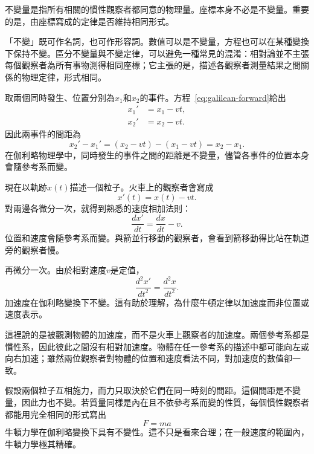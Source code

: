 不變量是指所有相關的慣性觀察者都同意的物理量。座標本身不必是不變量。重要的是，由座標寫成的定律是否維持相同形式。

「不變」既可作名詞，也可作形容詞。數值可以是不變量，方程也可以在某種變換下保持不變。區分不變量與不變定律，可以避免一種常見的混淆：相對論並不主張每個觀察者為所有事物測得相同座標；它主張的是，描述各觀察者測量結果之間關係的物理定律，形式相同。

取兩個同時發生、位置分別為\(x_1\)和\(x_2\)的事件。方程~\eqref{eq:galilean-forward}給出
\begin{align}
x_1'&=x_1-vt,\\
x_2'&=x_2-vt.
\end{align}
因此兩事件的間距為
\begin{equation}
x_2'-x_1'=(x_2-vt)-(x_1-vt)=x_2-x_1.
\end{equation}
在伽利略物理學中，同時發生的事件之間的距離是不變量，儘管各事件的位置本身會隨參考系而變。

\begin{classroomqa}
\end{classroomqa}

現在以軌跡\(x(t)\)描述一個粒子。火車上的觀察者會寫成
\begin{equation}
x'(t)=x(t)-vt.
\end{equation}
對兩邊各微分一次，就得到熟悉的速度相加法則：
\begin{equation}
\frac{dx'}{dt}=\frac{dx}{dt}-v.
\end{equation}
位置和速度會隨參考系而變。與箭並行移動的觀察者，會看到箭移動得比站在軌道旁的觀察者慢。

再微分一次。由於相對速度\(v\)是定值，
\begin{equation}
\frac{d^2x'}{dt^2}=\frac{d^2x}{dt^2}.
\end{equation}
加速度在伽利略變換下不變。這有助於理解，為什麼牛頓定律以加速度而非位置或速度表示。

這裡說的是被觀測物體的加速度，而不是火車上觀察者的加速度。兩個參考系都是慣性系，因此彼此之間沒有相對加速度。物體在任一參考系的描述中都可能向左或向右加速；雖然兩位觀察者對物體的位置和速度看法不同，對加速度的數值卻一致。

假設兩個粒子互相施力，而力只取決於它們在同一時刻的間距。這個間距是不變量，因此力也不變。若質量同樣是內在且不依參考系而變的性質，每個慣性觀察者都能用完全相同的形式寫出
\begin{equation}
F=ma
\end{equation}
牛頓力學在伽利略變換下具有不變性。這不只是看來合理；在一般速度的範圍內，牛頓力學極其精確。

